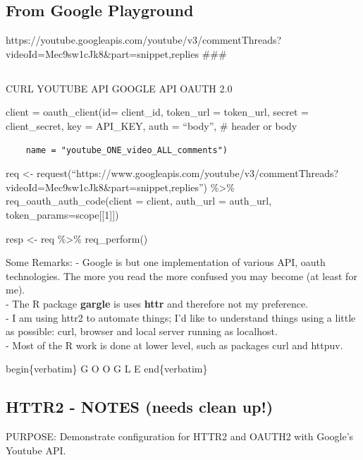 \documentclass[
]{report}
\begin{document}
\subsection{From Google Playground}\label{from-google-playground}

https://youtube.googleapis.com/youtube/v3/commentThreads?videoId=Mec9sw1cJk8\&part=snippet,replies
\#\#\#

\subsection{}\label{section-1}

CURL \textbar{} YOUTUBE API \textbar{} GOOGLE API \textbar{} OAUTH 2.0
\textbar{}

client = oauth\_client(id= client\_id, token\_url = token\_url, secret =
client\_secret, key = API\_KEY, auth = ``body'', \# header or body

\begin{verbatim}
    name = "youtube_ONE_video_ALL_comments")
\end{verbatim}

req \textless-
request(``https://www.googleapis.com/youtube/v3/commentThreads?videoId=Mec9sw1cJk8\&part=snippet,replies'')
\%\textgreater\% req\_oauth\_auth\_code(client = client, auth\_url =
auth\_url, token\_params=scope{[}{[}1{]}{]})

resp \textless- req \%\textgreater\% req\_perform()

Some Remarks: - Google is but one implementation of various API, oauth
technologies. The more you read the more confused you may become (at
least for me).\\
- The R package \textbf{gargle} is uses \textbf{httr} and therefore not
my preference.\\
- I am using httr2 to automate things; I'd like to understand things
using a little as possible: curl, browser and local server running as
localhost.\\
- Most of the R work is done at lower level, such as packages curl and
httpuv.

begin\{verbatim\} G O O G L E end\{verbatim\}

\subsection{HTTR2 - NOTES (needs clean
up!)}\label{httr2---notes-needs-clean-up}

PURPOSE: Demonstrate configuration for HTTR2 and OAUTH2 with Google's
Youtube API.
\end{document}
